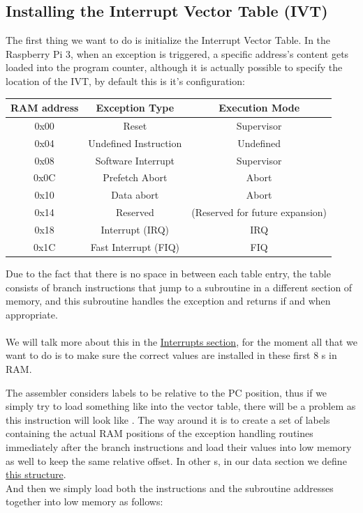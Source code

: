 \documentclass[12pt, svgnames]{book}
\begin{document}
\subsection{Installing the Interrupt Vector Table (IVT)}
\label{sec:IVT}
The first thing we want to do is initialize the Interrupt Vector Table. In the Raspberry Pi 3, when an exception is triggered, a specific address's content gets loaded into the program counter, although it is actually possible to specify the location of the IVT, by default this is it's configuration:
\begin{center}
{
\begin{tabular}{ |c|c|c| }
	\hline
	RAM address & Exception Type 		& Execution Mode	\\
	\hline
	0x00		& Reset					& Supervisor		\\
	0x04		& Undefined Instruction	& Undefined			\\
	0x08		& Software Interrupt	& Supervisor		\\
	0x0C		& Prefetch Abort 		& Abort				\\
	0x10		& Data abort 			& Abort				\\
	0x14		& Reserved				& (Reserved for future expansion)\\
	0x18		& Interrupt (IRQ)		& IRQ					\\
	0x1C		& Fast Interrupt (FIQ) 	& FIQ					\\
	\hline
\end{tabular}
}
\end{center}

Due to the fact that there is no space in between each table entry, the table consists of branch instructions that jump to a subroutine in a different section of memory, and this subroutine handles the exception and returns if and when appropriate.
\\~\\
We will talk more about this in the \hyperref[sec:Interrupts]{Interrupts section}, for the moment all that we want to do is to  make sure the correct values are installed in these first 8 s in RAM.

The assembler considers labels to be relative to the PC position, thus if we simply try to load something like  into the vector table, there will be a problem as this instruction will look like . The way around it is to create a set of labels containing the actual RAM positions of the exception handling routines immediately after the branch instructions and load their values into low memory as well to keep the same relative offset. In other s, in our data section we define \hyperlink{IVT}{this structure}.
\\
And then we simply load both the instructions and the subroutine addresses together into low memory as follows: 
\end{document}
